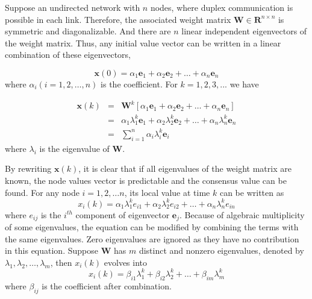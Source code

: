 Suppose an undirected network with $n$ nodes, where duplex communication
is possible in each link. Therefore, the associated weight matrix
$\mathbf{W}\in\mathbf{R}^{n\times n}$ is symmetric and diagonalizable.
And there are $n$ linear independent eigenvectors of the weight matrix.
Thus, any initial value vector can be written in a linear combination
of these eigenvectors, 

\begin{equation}
\mathbf{x}\left(0\right)=\alpha_{1}\mathbf{e}_{1}+\alpha_{2}\mathbf{e}_{2}+\ldots+\alpha_{n}\mathbf{e}_{n}
\end{equation}
where $\alpha_{i}(i=1,2,\ldots,n)$ is the coefficient. For $k=1,2,3,...$
we have

\begin{eqnarray}
\mathbf{x}\left(k\right) & = & \mathbf{W}^{k}\left[\alpha_{1}\mathbf{e}_{1}+\alpha_{2}\mathbf{e}_{2}+\ldots+\alpha_{n}\mathbf{e}_{n}\right]\nonumber \\
 & = & \alpha_{1}\lambda_{1}^{k}\mathbf{e}_{1}+\alpha_{2}\lambda_{2}^{k}\mathbf{e}_{2}+\ldots+\alpha_{n}\lambda_{n}^{k}\mathbf{e}_{n}\label{eq:x(k) decomposition}\\
 & = & \sum_{i=1}^{n}\alpha_{i}\lambda_{i}^{k}\mathbf{e}_{i}\nonumber 
\end{eqnarray}
where $\lambda_{i}$ is the eigenvalue of $\mathbf{W}$. 

By rewriting $\mathbf{x}\left(k\right)$, it is clear that if all
eigenvalues of the weight matrix are known, the node values vector
is predictable and the consensus value can be found. For any node
$i=1,2,\ldots n$, its local value at time $k$ can be written as
\begin{equation}
x_{i}\left(k\right)=\alpha_{1}\lambda_{1}^{k}e_{i1}+\alpha_{2}\lambda_{2}^{k}e_{i2}+\ldots+\alpha_{n}\lambda_{n}^{k}e_{in}
\end{equation}
where $e_{ij}$ is the $i^{th}$ component of eigenvector $\mathbf{e}_{j}$.
Because of algebraic multiplicity of some eigenvalues, the equation
can be modified by combining the terms with the same eigenvalues.
Zero eigenvalues are ignored as they have no contribution in this
equation. Suppose $\mathbf{W}$ has $m$ distinct and nonzero eigenvalues,
denoted by $\lambda_{1},\lambda_{2},\ldots,\lambda_{m}$, then $x_{i}\left(k\right)$
evolves into 
\begin{equation}
x_{i}\left(k\right)=\beta_{i1}\lambda_{1}^{k}+\beta_{i2}\lambda_{2}^{k}+\ldots+\beta_{im}\lambda_{m}^{k}
\end{equation}
where $\beta_{ij}$ is the coefficient after combination. 



